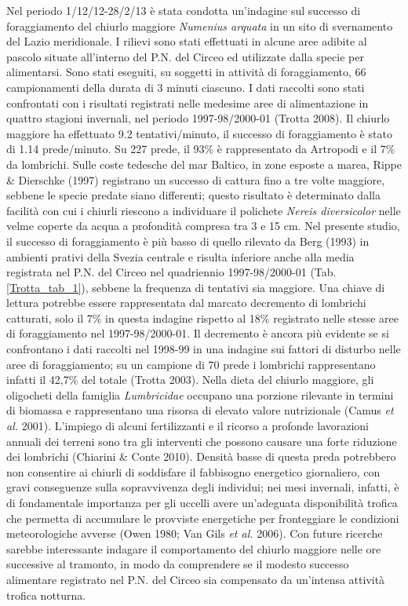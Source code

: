 Nel periodo 1/12/12-28/2/13 \`e stata condotta
un{\textquoteright}indagine sul successo di foraggiamento del chiurlo
maggiore \textit{Numenius arquata} in un sito di svernamento del Lazio
meridionale. I rilievi sono stati effettuati in alcune aree adibite al
pascolo situate all{\textquoteright}interno del P.N. del Circeo ed
utilizzate dalla specie per alimentarsi. Sono stati eseguiti, su
soggetti in attivit\`a di foraggiamento, 66 campionamenti della durata
di 3 minuti ciascuno. I dati raccolti sono stati confrontati con i
risultati registrati nelle medesime aree di alimentazione in quattro
stagioni invernali, nel periodo 1997-98/2000-01 (Trotta 2008). Il
chiurlo maggiore ha effettuato 9.2 tentativi/minuto, il successo di
foraggiamento \`e stato di 1.14 prede/minuto. Su 227 prede, il 93\% \`e
rappresentato da Artropodi e il 7\% da lombrichi.
{Sulle coste tedesche del mar Baltico, in zone esposte
a marea, Rippe \& Dierschke (1997) registrano un successo di cattura
fino a tre volte maggiore,}\textcolor{red}{ }{sebbene
le specie predate siano differenti;}\textcolor{red}{
}{questo risultato \`e determinato dalla facilit\`a
con cui i chiurli riescono a individuare il polichete
}\textit{{Nereis diversicolor}}{
nelle velme }{coperte da acqua a profondit\`a compresa
tra 3 e 15 cm.}{ }Nel presente studio, il successo di
foraggiamento \`e pi\`u basso di quello rilevato da Berg (1993) in
ambienti prativi della Svezia centrale e risulta inferiore anche alla
media registrata nel P.N. del Circeo nel quadriennio 1997-98/2000-01
(Tab. \ref{Trotta_tab_1}), sebbene la frequenza di tentativi sia maggiore. Una chiave di
lettura potrebbe essere rappresentata dal marcato decremento di
lombrichi catturati, solo il 7\% in questa indagine rispetto al 18\%
registrato nelle stesse aree di foraggiamento nel 1997-98/2000-01. Il
decremento \`e ancora pi\`u evidente se si confrontano i dati raccolti
nel 1998-99 in una indagine sui fattori di disturbo nelle aree di
foraggiamento; su un campione di 70 prede i lombrichi rappresentano
infatti il 42,7\% del totale (Trotta 2003). Nella dieta del chiurlo
maggiore, gli oligocheti della famiglia \textit{Lumbricidae} occupano
una porzione rilevante in termini di biomassa e rappresentano una
risorsa di elevato valore nutrizionale (Camus \textit{et al.} 2001).
L{\textquoteright}impiego di alcuni fertilizzanti e il ricorso a
profonde lavorazioni annuali dei terreni sono tra gli interventi che
possono causare una forte riduzione dei lombrichi (Chiarini \& Conte
2010). Densit\`a basse di questa preda potrebbero non consentire ai
chiurli di soddisfare il fabbisogno energetico giornaliero, con gravi
conseguenze sulla sopravvivenza degli individui; nei mesi invernali,
infatti, \`e di fondamentale importanza per gli uccelli avere
un{\textquoteright}adeguata disponibilit\`a trofica che permetta di
accumulare le provviste energetiche per fronteggiare le condizioni
meteorologiche avverse (Owen 1980; Van Gils \textit{et al.} 2006). Con
future ricerche sarebbe interessante indagare il comportamento del
chiurlo maggiore nelle ore successive al tramonto, in modo da
comprendere se il modesto successo alimentare registrato nel P.N. del
Circeo sia compensato da un{\textquoteright}intensa attivit\`a trofica
notturna.

